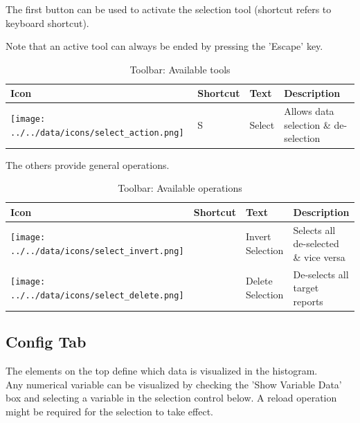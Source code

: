 The first button can be used to activate the selection tool (shortcut refers to keyboard shortcut). 

Note that an active tool can always be ended by pressing the 'Escape' key. 

\begin{table}[H]
  \center
  \begin{tabular}{ | l | l | l | l |}
    \hline
    \textbf{Icon} & \textbf{Shortcut} & \textbf{Text} & \textbf{Description} \\ \hline
    \texttt{[image: ../../data/icons/select\_action.png]} & S & Select & Allows data selection \& de-selection \\ \hline
  \end{tabular}
  \caption{Toolbar: Available tools}
\end{table}

The others provide general operations.

\begin{table}[H]
  \center
  \begin{tabular}{ | l | l | l | l |}
    \hline
    \textbf{Icon} & \textbf{Shortcut} &\textbf{Text} &  \textbf{Description} \\ \hline
    \texttt{[image: ../../data/icons/select\_invert.png]} & & Invert Selection & Selects all de-selected \& vice versa \\ \hline
    \texttt{[image: ../../data/icons/select\_delete.png]} & & Delete Selection & De-selects all target reports \\ \hline
  \end{tabular}
  \caption{Toolbar: Available operations}
\end{table} 

\subsection{Config Tab}

The elements on the top define which data is visualized in the histogram. \\

Any numerical variable can be visualized by checking the 'Show Variable Data' box and selecting a variable in the selection control below.
A reload operation might be required for the selection to take effect. \\

